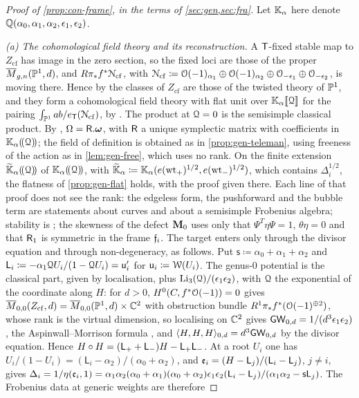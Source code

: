 \begin{proof}[Proof of \cref{prop:con-frame}, in the terms of \cref{sec:gen,sec:fra}]
Let $\mathbb{K}_{\alpha}$ here denote $\mathbb{Q}(\alpha_0,\alpha_1,\alpha_2,\epsilon_1,\epsilon_2)$.

\emph{(a) The cohomological field theory and its reconstruction.} A $\mathsf{T}$-fixed stable map to $Z_{\mathrm{cf}}$ has image in the zero section, so the fixed loci are those of the proper $\overline{M}_{g,n}(\mathbb{P}^1,d)$, and $R\pi_*f^*\mathcal{N}_{\mathrm{cf}}$, with $\mathcal{N}_{\mathrm{cf}}\coloneqq\mathcal{O}(-1)_{\alpha_1}\oplus\mathcal{O}(-1)_{\alpha_2}\oplus\mathcal{O}_{-\epsilon_1}\oplus\mathcal{O}_{-\epsilon_2}$, is moving there. Hence by \cite{GP99} the classes of $Z_{\mathrm{cf}}$ are those of the twisted theory of $\mathbb{P}^1$, and they form a cohomological field theory with flat unit over $\mathbb{K}_{\alpha}[\![ \mathcal{Q} ]\!]$ for the pairing $\int_{\mathbb{P}^1}ab/e_{\mathsf{T}}(\mathcal{N}_{\mathrm{cf}})$, by \cite[App.~1, (iv)--(vi)]{CG07}. The product at $\mathcal{Q}=0$ is the semisimple classical product. By \cite[Theorem~(2), Prop.~8.7(ii)]{Tel12}, $\Omega=\mathsf{R}.\boldsymbol{\omega}$, with $\mathsf{R}$ a unique symplectic matrix with coefficients in $\mathbb{K}_{\alpha}(\!(\mathcal{Q})\!)$; the field of definition is obtained as in \cref{prop:gen-teleman}, using freeness of the action as in \cref{lem:gen-free}, which uses no rank. On the finite extension $\widetilde{\mathbb{K}}_{\alpha}(\!(\mathcal{Q})\!)$ of $\mathbb{K}_{\alpha}(\!(\mathcal{Q})\!)$, with $\widetilde{\mathbb{K}}_{\alpha}\coloneqq\mathbb{K}_{\alpha}(e(\mathrm{wt}_+)^{1/2},e(\mathrm{wt}_-)^{1/2})$, which contains $\Delta_i^{1/2}$, the flatness of \cref{prop:gen-flat} holds, with the proof given there. Each line of that proof does not see the rank: the edgeless form, the pushforward and the bubble term are statements about curves and about a semisimple Frobenius algebra; stability is \cite[2.17--2.19, (2.15)]{Tel12}; the skewness of the defect $\mathbf{M}_0$ uses only that $\Psi^T\eta\Psi=1$, $\theta\eta=0$ and that $\mathsf{R}_1$ is symmetric in the frame $\mathfrak{f}_i$. The target enters only through the divisor equation and through non-degeneracy, as follows. Put $\mathsf{s}\coloneqq\alpha_0+\alpha_1+\alpha_2$ and $\mathsf{L}_i\coloneqq-\alpha_1\mathcal{Q} U_i/(1-\mathcal{Q} U_i)=\mathsf{u}_i'$ for $\mathsf{u}_i\coloneqq\mathcal{W}(U_i)$. The genus-$0$ potential is the classical part, given by localisation, plus $\mathrm{Li}_3(\mathcal{Q})/(\epsilon_1\epsilon_2)$, with $\mathcal{Q}$ the exponential of the coordinate along $H$: for $d>0$, $H^0(C,f^*\mathcal{O}(-1))=0$ gives $\overline{M}_{0,0}(Z_{\mathrm{cf}},d)=\overline{M}_{0,0}(\mathbb{P}^1,d)\times\mathbb{C}^2$ with obstruction bundle $R^1\pi_*f^*(\mathcal{O}(-1)^{\oplus 2})$, whose rank is the virtual dimension, so localising on $\mathbb{C}^2$ gives $\mathsf{GW}_{0,d}=1/(d^3\epsilon_1\epsilon_2)$, the Aspinwall--Morrison formula \cite[p.~3]{FP00}, and $\langle H,H,H\rangle_{0,d}=d^3\mathsf{GW}_{0,d}$ by the divisor equation. Hence $H\circ H=(\mathsf{L}_++\mathsf{L}_-)H-\mathsf{L}_+\mathsf{L}_-$. At a root $U_i$ one has $U_i/(1-U_i)=(\mathsf{L}_i-\alpha_2)/(\alpha_0+\alpha_2)$, and $\mathfrak{e}_i=(H-\mathsf{L}_j)/(\mathsf{L}_i-\mathsf{L}_j)$, $j\neq i$, gives $\Delta_i=1/\eta(\mathfrak{e}_i,1)=\alpha_1\alpha_2(\alpha_0+\alpha_1)(\alpha_0+\alpha_2)\epsilon_1\epsilon_2(\mathsf{L}_i-\mathsf{L}_j)/(\alpha_1\alpha_2-\mathsf{s}\mathsf{L}_j)$. The Frobenius data at generic weights are therefore

\end{proof}
